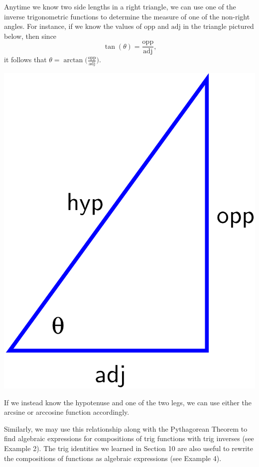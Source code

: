 \documentclass{ximera}
\begin{document}
\begin{summary}
Anytime we know two side lengths in a right triangle, we can use one of the inverse trigonometric functions to determine the measure of one of the non-right angles.  For instance, if we know the values of $\text{opp}$ and $\text{adj}$ in the triangle pictured below, then since%
\begin{equation*}
\tan(\theta) = \frac{\text{opp}}{\text{adj}}\text{,}
\end{equation*}
it follows that $\theta = \arctan\!\bigg(\frac{\text{opp}}{\text{adj}}\bigg)$.%
%
\begin{image}
\includegraphics[width=.5\linewidth]{right-triangle-SOH-CAH-TOA.png}
\end{image}
%
\par
%
If we instead know the hypotenuse and one of the two legs, we can use either the arcsine or arccosine function accordingly.%

Similarly, we may use this relationship along with the Pythagorean Theorem to find algebraic expressions for compositions of trig functions with trig inverses (see Example 2). The trig identities we learned in Section 10 are also useful to rewrite the compositions of functions as algebraic expressions (see Example 4). 
%

\end{summary}
\end{document}
